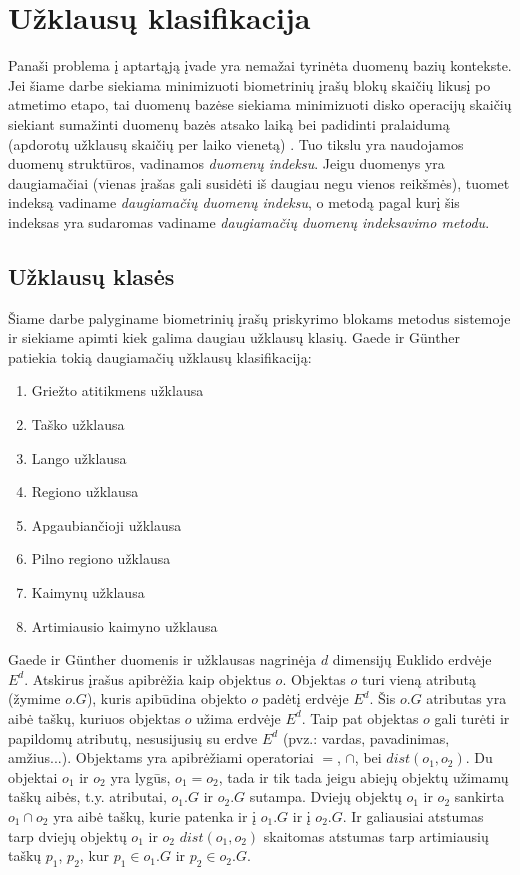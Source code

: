 \section{Užklausų klasifikacija}

Panaši problema į aptartąją įvade yra nemažai tyrinėta duomenų bazių kontekste.
Jei šiame darbe siekiama minimizuoti biometrinių įrašų blokų skaičių likusį po atmetimo etapo, tai duomenų bazėse siekiama minimizuoti disko operacijų skaičių siekiant sumažinti duomenų bazės atsako laiką bei padidinti pralaidumą (apdorotų užklausų skaičių per laiko vienetą) \cite{garcia2000database}.
Tuo tikslu yra naudojamos duomenų struktūros, vadinamos {\it duomenų indeksu}.
Jeigu duomenys yra daugiamačiai (vienas įrašas gali susidėti iš daugiau negu vienos reikšmės), tuomet indeksą vadiname {\it daugiamačių duomenų indeksu}, o metodą pagal kurį šis indeksas yra sudaromas vadiname {\it daugiamačių duomenų indeksavimo metodu}.

\subsection{Užklausų klasės}

Šiame darbe palyginame biometrinių įrašų priskyrimo blokams metodus sistemoje \cite{NeurotechnologyMegamatcherAccelerator} ir siekiame apimti kiek galima daugiau užklausų klasių.
Gaede ir Günther \cite{gaede1998multidimensional} patiekia tokią daugiamačių užklausų klasifikaciją:
\begin{enumerate}
	\item Griežto atitikmens užklausa
	\item Taško užklausa
	\item Lango užklausa
	\item Regiono užklausa
	\item Apgaubiančioji užklausa
	\item Pilno regiono užklausa
	\item Kaimynų užklausa
	\item Artimiausio kaimyno užklausa
\end{enumerate}

Gaede ir Günther \cite{gaede1998multidimensional} duomenis ir užklausas nagrinėja $d$ dimensijų Euklido erdvėje $E^d$.
Atskirus įrašus apibrėžia kaip objektus $o$.
Objektas $o$ turi vieną atributą (žymime $o.G$), kuris apibūdina objekto $o$ padėtį erdvėje $E^d$.
Šis $o.G$ atributas yra aibė taškų, kuriuos objektas $o$ užima erdvėje $E^d$.
Taip pat objektas $o$ gali turėti ir papildomų atributų, nesusijusių su erdve $E^d$ (pvz.: vardas, pavadinimas, amžius...).
Objektams yra apibrėžiami operatoriai $=$, $\cap$, bei $dist(o_1, o_2)$.
Du objektai $o_1$ ir $o_2$ yra lygūs, $o_1 = o_2$, tada ir tik tada jeigu abiejų objektų užimamų taškų aibės, t.y. atributai, $o_1.G$ ir $o_2.G$ sutampa.
Dviejų objektų $o_1$ ir $o_2$ sankirta $o_1 \cap o_2$ yra aibė taškų, kurie patenka ir į $o_1.G$ ir į $o_2.G$.
Ir galiausiai atstumas tarp dviejų objektų $o_1$ ir $o_2$ $dist(o_1, o_2)$ skaitomas atstumas tarp artimiausių taškų $p_1$, $p_2$, kur $p_1 \in o_1.G$ ir $p_2 \in o_2.G$.



